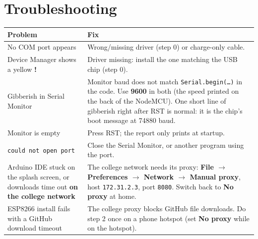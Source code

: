 \documentclass[11pt]{article}
\newcommand{\menu}[1]{\textbf{#1}}
\begin{document}
\section*{Troubleshooting}
\begin{tabular}{@{}>{\raggedright}p{5.4cm} >{\raggedright\arraybackslash}p{11.2cm}@{}}
\toprule
\textbf{Problem} & \textbf{Fix} \\
\midrule
No COM port appears & Wrong/missing driver (step 0) or charge-only cable. \\
Device Manager shows a yellow \textbf{!} & Driver missing: install the one matching the USB chip (step 0). \\
Gibberish in Serial Monitor & Monitor baud does not match \texttt{Serial.begin(\dots)} in the code. Use \textbf{9600} in both (the speed printed on the back of the NodeMCU). One short line of gibberish right after RST is normal: it is the chip's boot message at 74880 baud. \\
Monitor is empty & Press RST; the report only prints at startup. \\
\texttt{could not open port} & Close the Serial Monitor, or another program using the port. \\
Arduino IDE stuck on the splash screen, or downloads time out \textbf{on the college network} & The college network needs its proxy: \menu{File $\rightarrow$ Preferences $\rightarrow$ Network $\rightarrow$ Manual proxy}, host \texttt{172.31.2.3}, port \texttt{8080}. Switch back to \menu{No proxy} at home. \\
ESP8266 install fails with a GitHub download timeout & The college proxy blocks GitHub file downloads. Do step 2 once on a phone hotspot (set \menu{No proxy} while on the hotspot). \\
\bottomrule
\end{tabular}
\end{document}
